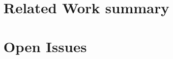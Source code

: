 \documentclass{article}
\begin{document}
% 

\section{Related Work summary}



% 


% 

\section*{Open Issues}


\printbibliography
\end{document}
